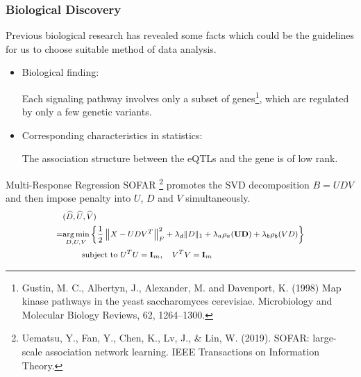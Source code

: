 \begin{frame}\frametitle{Biological Discovery}
    Previous biological research has revealed some facts which could be the guidelines for us to choose suitable method of data analysis.

    \begin{itemize}
        
        \item Biological finding: 
        
              Each signaling pathway involves only a subset of genes\footnote[1]{Gustin, M. C., Albertyn, J., Alexander, M. and Davenport, K. (1998) Map kinase pathways in the yeast saccharomyces cerevisiae. Microbiology and Molecular Biology Reviews, 62, 1264–1300.}, which are regulated by only a few genetic variants.

        \item Corresponding characteristics in statistics: 
        
              The association structure between the eQTLs and the gene is of low rank.
    \end{itemize}
\end{frame}

\begin{frame}{Multi-Response Regression}
    SOFAR \footnote[1]{Uematsu, Y., Fan, Y., Chen, K., Lv, J., \& Lin, W. (2019). SOFAR: large-scale association network learning. IEEE Transactions on Information Theory.} 
    promotes the SVD decomposition $B= UDV$ and then impose penalty into $U$, $D$ and $V$ simultaneously. 
    \begin{equation*}\footnotesize
        \begin{split}
            & (\widehat{D}, \widehat{U}, \widehat{V}) \\
            = & \underset{D, U, V}{\arg \min }\left\{\frac{1}{2} \left\|X- UDV^{T}\right\|_{F}^{2}+\lambda_{d}\|D\|_{1}+\lambda_{a} \rho_{a}(\mathbf{U D})+\lambda_{b} \rho_{b}(VD)\right\} \\ 
            & \quad\quad \text { subject to } U^{T} U=\mathbf{I}_{m}, \quad V^{T} V=\mathbf{I}_{m} 
        \end{split}
    \end{equation*}
\end{frame}

